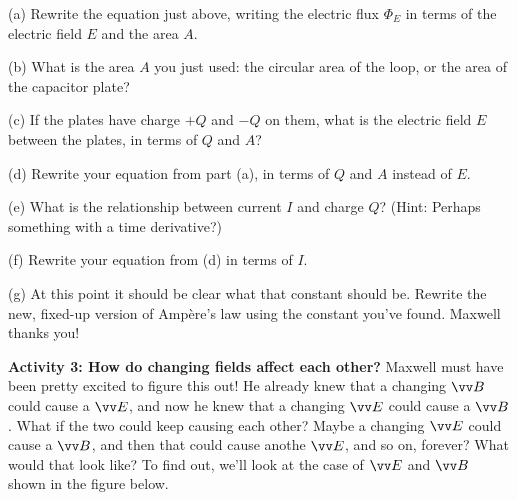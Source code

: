 (a) Rewrite the equation just above, writing the electric flux $\Phi_E$ in terms of the electric field $E$ and the area $A$.
\vspace{0.4in}

(b) What is the area $A$ you just used: the circular area of the loop, or the area of the capacitor plate?
\vspace{0.4in}

(c) If the plates have charge $+Q$ and $-Q$ on them, what is the electric field $E$ between the plates, in terms of $Q$ and $A$?
\vspace{0.6in}

(d) Rewrite your equation from part (a), in terms of $Q$ and $A$ instead of $E$.
\vspace{0.5in}

(e) What is the relationship between current $I$ and charge $Q$? (Hint: Perhaps something with a time derivative?)
\vspace{0.3in}

(f) Rewrite your equation from (d) in terms of $I$.
\vspace{0.5in}

(g) At this point it should be clear what that constant should be.  Rewrite the new, fixed-up version of Amp\`ere's law using the constant you've found.  Maxwell thanks you!  
\vfill
\newpage

\textbf{Activity 3: How do changing fields affect each other?} \newline
Maxwell must have been pretty excited to figure this out!  He already knew that a changing $\vv B$ could cause a $\vv E$, and now he knew that a changing $\vv E$ could cause a $\vv B$.  What if the two could keep causing each other?  Maybe a changing $\vv E$ could cause a $\vv B$, and then that could cause anothe $\vv E$, and so on, forever?  What would that look like? To find out, we'll look at the case of $\vv E$ and $\vv B$ shown in the figure below.


